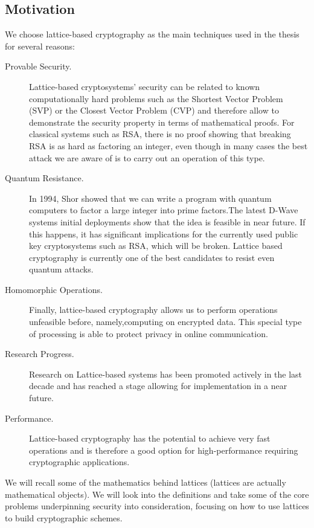 \subsection{Motivation}
\label{ssub:The motivations}
We choose lattice-based cryptography as the main techniques used in the
thesis for several reasons:
\begin{description}
\item[Provable Security.] Lattice-based cryptosystems' security can be related
  to known computationally hard problems such as the Shortest Vector Problem (SVP)
  or the Closest Vector Problem (CVP) and therefore allow to demonstrate the security
  property in terms of mathematical proofs. For classical systems such as RSA,
  there is no proof showing that breaking RSA is as hard as factoring an integer,
  even though in many cases the best attack we are aware of is to carry out an operation of this type.
\item[Quantum Resistance.] In 1994, Shor \cite{shor1994algorithms} showed that
  we can write a program with quantum computers to factor a large integer
  into prime factors.The latest D-Wave systems initial deployments show that the
  idea is feasible in near future. If this happens, it has significant
  implications for the currently used public key cryptosystems such as RSA, which
  will be broken. Lattice based cryptography is currently one of the best
  candidates to resist even quantum attacks.
\item[Homomorphic Operations.] Finally, lattice-based cryptography allows us to
  perform operations unfeasible before, namely,computing on encrypted data. This
  special type of processing is able to protect privacy in online
  communication.
\item[Research Progress.] Research on Lattice-based systems has been promoted actively
  in the last decade and has reached a stage allowing for
  implementation in a near future.
\item[Performance.] Lattice-based cryptography has the potential to achieve very
  fast operations and is therefore a good option for high-performance requiring
  cryptographic applications.
\end{description}
We will recall some of the mathematics behind lattices (lattices are actually
mathematical objects). We will look into the definitions and take some of the core
problems underpinning security into consideration, focusing on how to use lattices to build
cryptographic schemes.



